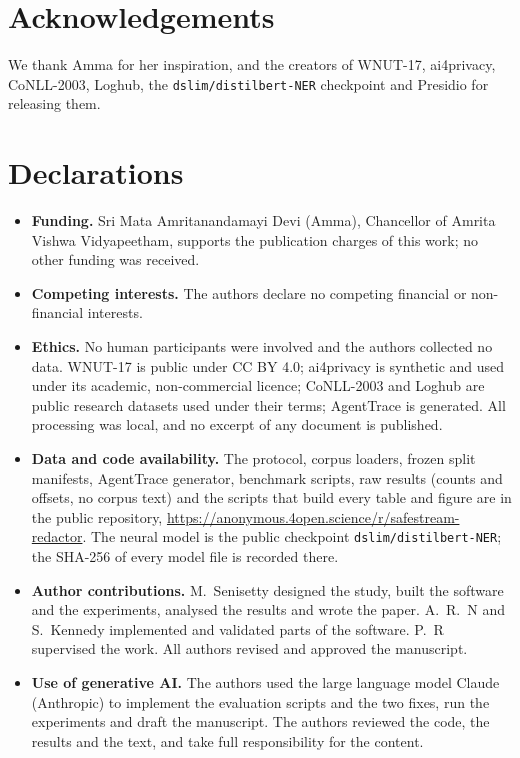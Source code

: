 \documentclass[conference]{IEEEtran}
\newcommand{\repolink}{\url{https://anonymous.4open.science/r/safestream-redactor}}
\newcommand{\repolink}{\url{https://github.com/MounishSenisetty/SafeStream-Redactor}}
\begin{document}
\ifanonymous\else
\section*{Acknowledgements}
We thank Amma for her inspiration, and the creators of WNUT-17, ai4privacy, CoNLL-2003, Loghub, the \texttt{dslim/distilbert-NER} checkpoint and Presidio for releasing them.

\fi
\section*{Declarations}
\begin{itemize}
\ifanonymous\else
\item \textbf{Funding.} Sri Mata Amritanandamayi Devi (Amma), Chancellor of Amrita Vishwa Vidyapeetham, supports the publication charges of this work; no other funding was received.
\fi
\item \textbf{Competing interests.} The authors declare no competing financial or non-financial interests.
\item \textbf{Ethics.} No human participants were involved and the authors collected no data. WNUT-17 is public under CC BY 4.0; ai4privacy is synthetic and used under its academic, non-commercial licence; CoNLL-2003 and Loghub are public research datasets used under their terms; AgentTrace is generated. All processing was local, and no excerpt of any document is published.
\item \textbf{Data and code availability.} The protocol, corpus loaders, frozen split manifests, AgentTrace generator, benchmark scripts, raw results (counts and offsets, no corpus text) and the scripts that build every table and figure are in the public repository, \repolink{}. The neural model is the public checkpoint \texttt{dslim/distilbert-NER}; the SHA-256 of every model file is recorded there.
\ifanonymous\else
\item \textbf{Author contributions.} M.~Senisetty designed the study, built the software and the experiments, analysed the results and wrote the paper. A.~R.~N and S.~Kennedy implemented and validated parts of the software. P.~R supervised the work. All authors revised and approved the manuscript.
\fi
\item \textbf{Use of generative AI.} The authors used the large language model Claude (Anthropic) to implement the evaluation scripts and the two fixes, run the experiments and draft the manuscript. The authors reviewed the code, the results and the text, and take full responsibility for the content.
\end{itemize}
\end{document}

